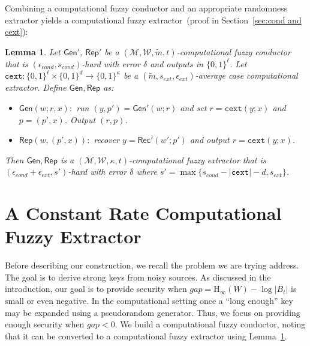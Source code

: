 \documentclass[11pt]{article}
\newcommand{\secref}[1]{\mbox{Section~\ref{#1}}}
\newcommand{\lemref}[1]{\mbox{Lemma~\ref{#1}}}
\newcommand{\class}[1]{{\ensuremath{\mathsf{#1}}}}
\newcommand{\gen}{\ensuremath{\class{Gen}}\xspace}
\newcommand{\rep}{\ensuremath{\class{Rep}}\xspace}
\newcommand{\rec}{\ensuremath{\class{Rec}}\xspace}
\newcommand{\zo}{\ensuremath{\{0, 1\}}}
\newcommand{\Hoo}{\mathrm{H}_\infty}
\newcommand{\cext}{\ensuremath{\mathtt{cext}}}
\newtheorem{lemma}[theorem]{Lemma}
\begin{document}
Combining a computational fuzzy conductor and an appropriate randomness extractor yields a computational fuzzy extractor~(proof in \secref{sec:cond and cext}):

\begin{lemma}
\label{lem:cond and cext}
Let $\gen'$, $\rep'$ be a $(\mathcal{M}, \mathcal{W}, \tilde{m}, t)$-computational fuzzy conductor that is $(\epsilon_{cond}, s_{cond})$-hard with error $\delta$ and outputs in $\zo^\ell$.  Let $\cext:\zo^\ell\times \zo^d\rightarrow \zo^\kappa$ be a $(\tilde{m}, s_{ext}, \epsilon_{ext})$-average case computational extractor.  Define $\gen, \rep$ as:
\begin{itemize}
\item $\gen(w; r, x):$ run $(y, p')= \gen'(w; r)$ and set $r = \cext(y; x)$ and $p = (p', x)$.  Output $(r, p)$.
\item $\rep(w, (p', x)):$ recover $y = \rec'(w'; p')$ and output $r = \cext(y; x)$. 
\end{itemize}
Then $\gen, \rep$ is a $(\mathcal{M}, \mathcal{W}, \kappa, t)$-computational fuzzy extractor that is $(\epsilon_{cond}+\epsilon_{ext}, s')$-hard with error $\delta$ where $s' = \max\{s_{cond} - |\cext| -d, s_{ext}\}$.
\end{lemma}


\section{A Constant Rate Computational Fuzzy Extractor}
\label{sec:construction}

Before describing our construction, we recall the problem we are trying address.  The goal is to derive strong keys from noisy sources.  As discussed in the introduction, our goal is to provide security when $gap = \Hoo(W) - \log|B_t|$ is small or even negative.
In the computational setting once a ``long enough'' key may be expanded using a pseudorandom generator.  Thus, we focus on providing enough security when $gap<0$.  We build a computational fuzzy conductor, noting that it can be converted to a computational fuzzy extractor using \lemref{lem:cond and cext}.%
\end{document}
